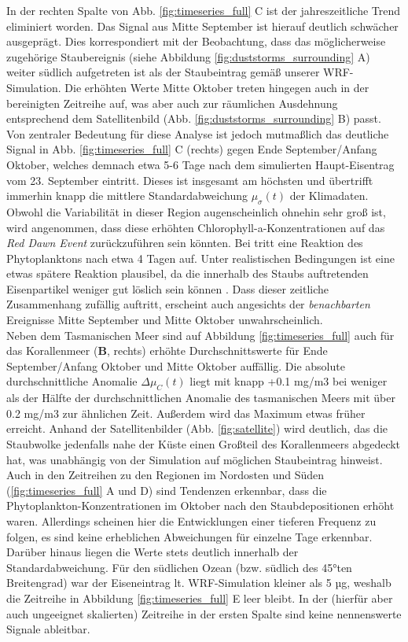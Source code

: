 \documentclass[12pt,a4paper,onecolumn]{scrartcl}
\begin{document}
In der rechten Spalte von Abb. \ref{fig:timeseries_full} C ist der jahreszeitliche Trend eliminiert worden. Das Signal aus Mitte September ist hierauf deutlich schwächer ausgeprägt. Dies korrespondiert mit der Beobachtung, dass das möglicherweise zugehörige Staubereignis (siehe Abbildung \ref{fig:duststorms_surrounding} A) weiter südlich aufgetreten ist als der Staubeintrag gemäß unserer WRF-Simulation. Die erhöhten Werte Mitte Oktober treten hingegen auch in der bereinigten Zeitreihe auf, was aber auch zur räumlichen Ausdehnung entsprechend dem Satellitenbild (Abb. \ref{fig:duststorms_surrounding} B) passt. Von zentraler Bedeutung für diese Analyse ist jedoch mutmaßlich das deutliche Signal in Abb. \ref{fig:timeseries_full} C (rechts) gegen Ende September/Anfang Oktober, welches demnach etwa 5-6 Tage nach dem simulierten Haupt-Eisentrag vom 23. September eintritt. Dieses ist insgesamt am höchsten und übertrifft immerhin knapp die mittlere Standardabweichung $\mu_\sigma(t)$ der Klimadaten. Obwohl die Variabilität in dieser Region augenscheinlich ohnehin sehr groß ist, wird angenommen, dass diese erhöhten Chlorophyll-a-Konzentrationen auf das \textit{Red Dawn Event} zurückzuführen sein könnten. Bei \citet{Martin.1988} tritt eine Reaktion des Phytoplanktons nach etwa 4 Tagen auf. Unter realistischen Bedingungen ist eine etwas spätere Reaktion plausibel, da die innerhalb des Staubs auftretenden Eisenpartikel weniger gut löslich sein können \citep{Shao.2011}. Dass dieser zeitliche Zusammenhang zufällig auftritt, erscheint auch angesichts der \textit{benachbarten} Ereignisse Mitte September und Mitte Oktober unwahrscheinlich. \\

Neben dem Tasmanischen Meer sind auf Abbildung \ref{fig:timeseries_full} auch für das Korallenmeer (\textbf{B}, rechts) erhöhte Durchschnittswerte für Ende September/Anfang Oktober und Mitte Oktober auffällig. Die absolute durchschnittliche Anomalie $\Delta \mu_C(t)$ liegt mit knapp +0.1 mg/m3 bei weniger als der Hälfte der durchschnittlichen Anomalie des tasmanischen Meers mit über 0.2 mg/m3 zur ähnlichen Zeit. Außerdem wird das Maximum etwas früher erreicht. Anhand der Satellitenbilder (Abb. \ref{fig:satellite}) wird deutlich, das die Staubwolke jedenfalls nahe der Küste einen Großteil des Korallenmeers abgedeckt hat, was unabhängig von der Simulation auf möglichen Staubeintrag hinweist. Auch in den Zeitreihen zu den Regionen im Nordosten und Süden (\ref{fig:timeseries_full} A und D) sind Tendenzen erkennbar, dass die Phytoplankton-Konzentrationen im Oktober nach den Staubdepositionen erhöht waren. Allerdings scheinen hier die Entwicklungen einer tieferen Frequenz zu folgen, es sind keine erheblichen Abweichungen für einzelne Tage erkennbar. Darüber hinaus liegen die Werte stets deutlich innerhalb der Standardabweichung. Für den südlichen Ozean (bzw. südlich des 45°ten Breitengrad) war der Eiseneintrag lt. WRF-Simulation kleiner als 5 µg, weshalb die Zeitreihe in Abbildung \ref{fig:timeseries_full} E leer bleibt. In der (hierfür aber auch  ungeeignet skalierten) Zeitreihe in der ersten Spalte sind keine nennenswerte Signale ableitbar.
\end{document}
